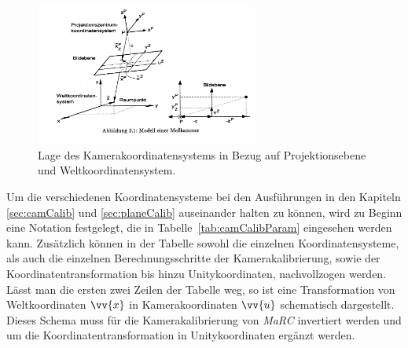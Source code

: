 \begin{figure}[H]
		\centering
		\includegraphics[width=0.65\textwidth , trim = 0mm 65mm 270mm 0mm, clip]{Bilder/cameraCalib.jpg}
			\caption{Lage des Kamerakoordinatensystems in Bezug auf Projektionsebene und Weltkoordinatensystem. \cite{Meisel:77890}}
			\label{fig:cameraCalib}
	\end{figure}

Um die verschiedenen Koordinatensysteme bei den Ausführungen in den Kapiteln \ref{sec:camCalib} und \ref{sec:planeCalib} auseinander halten zu können, wird zu Beginn eine Notation festgelegt, die in Tabelle~\ref{tab:camCalibParam} eingesehen werden kann. Zusätzlich können in der Tabelle sowohl die einzelnen Koordinatensysteme, als auch die einzelnen Berechnungsschritte der Kamerakalibrierung, sowie der Koordinatentransformation bis hinzu Unitykoordinaten, nachvollzogen werden. Lässt man die ersten zwei Zeilen der Tabelle weg, so ist eine Transformation von Weltkoordinaten $\vv{x}$ in Kamerakoordinaten $\vv{u}$ schematisch dargestellt. Dieses Schema muss für die Kamerakalibrierung von \textit{MaRC} invertiert werden und um die Koordinatentransformation in Unitykoordinaten ergänzt werden.\\

